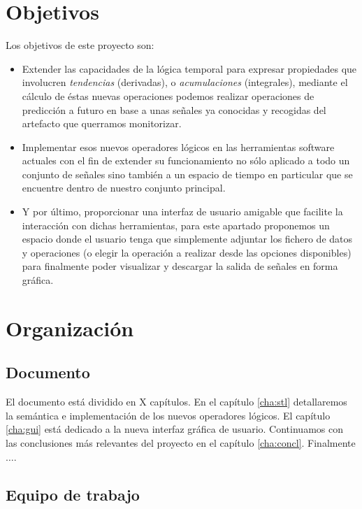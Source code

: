 \section{Objetivos}

Los objetivos de este proyecto son:

\begin{itemize}
\item Extender las capacidades de la lógica temporal para expresar propiedades que involucren \textit{tendencias} (derivadas), o \textit{acumulaciones} (integrales), mediante el cálculo de éstas nuevas operaciones podemos realizar operaciones de predicción a futuro en base a unas señales ya conocidas y recogidas del artefacto que querramos monitorizar.   
\item Implementar esos nuevos operadores lógicos en las herramientas software actuales con el fin de extender su funcionamiento no sólo aplicado a todo un conjunto de señales sino también a un espacio de tiempo en particular que se encuentre dentro de nuestro conjunto principal. 
\item Y por último, proporcionar una interfaz de usuario amigable que facilite la interacción con dichas herramientas, para este apartado  proponemos un espacio donde el usuario tenga que simplemente adjuntar los fichero de datos y operaciones (o elegir la operación a realizar desde las opciones disponibles) para finalmente poder visualizar y descargar la salida de señales en forma gráfica. 
\end{itemize}



\section{Organización}

\subsection{Documento}

El documento está dividido en X capítulos. En el capítulo \ref{cha:stl} detallaremos la semántica e implementación de los nuevos operadores lógicos. El capítulo \ref{cha:gui} está dedicado a la nueva interfaz gráfica de usuario. Continuamos con las conclusiones más relevantes del proyecto en el capítulo \ref{cha:concl}. Finalmente $\ldots$.

\subsection{Equipo de trabajo}


